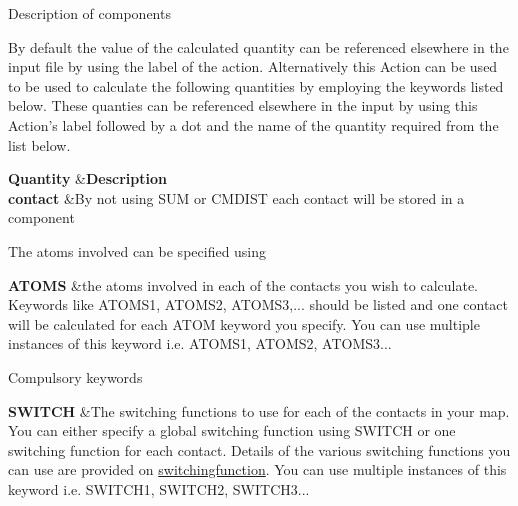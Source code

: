 \begin{DoxyParagraph}{Description of components}

\end{DoxyParagraph}
By default the value of the calculated quantity can be referenced elsewhere in the input file by using the label of the action. Alternatively this Action can be used to be used to calculate the following quantities by employing the keywords listed below. These quanties can be referenced elsewhere in the input by using this Action's label followed by a dot and the name of the quantity required from the list below.

\begin{TabularC}{2}
\hline
{\bfseries  Quantity }  &{\bfseries  Description }   \\
{\bfseries  contact } &By not using S\+U\+M or C\+M\+D\+I\+S\+T each contact will be stored in a component   \\
\end{TabularC}


\begin{DoxyParagraph}{The atoms involved can be specified using}

\end{DoxyParagraph}
\begin{TabularC}{2}
\hline
{\bfseries  A\+T\+O\+M\+S } &the atoms involved in each of the contacts you wish to calculate. Keywords like A\+T\+O\+M\+S1, A\+T\+O\+M\+S2, A\+T\+O\+M\+S3,... should be listed and one contact will be calculated for each A\+T\+O\+M keyword you specify. You can use multiple instances of this keyword i.\+e. A\+T\+O\+M\+S1, A\+T\+O\+M\+S2, A\+T\+O\+M\+S3...   \\
\end{TabularC}


\begin{DoxyParagraph}{Compulsory keywords}

\end{DoxyParagraph}
\begin{TabularC}{2}
\hline
{\bfseries  S\+W\+I\+T\+C\+H } &The switching functions to use for each of the contacts in your map. You can either specify a global switching function using S\+W\+I\+T\+C\+H or one switching function for each contact. Details of the various switching functions you can use are provided on \hyperlink{switchingfunction}{switchingfunction}. You can use multiple instances of this keyword i.\+e. S\+W\+I\+T\+C\+H1, S\+W\+I\+T\+C\+H2, S\+W\+I\+T\+C\+H3...   \\
\end{TabularC}


